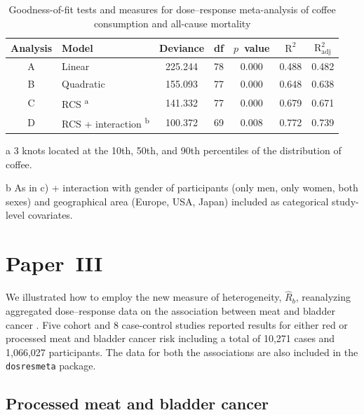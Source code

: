 \documentclass[11pt,a4paper,twoside,openany]{book}\usepackage{knitr}
\begin{document}
{{\begin{table}[!h]
\begin{threeparttable}
\caption{\label{tab:gof_tab}Goodness-of-fit tests and measures for dose--response meta-analysis of coffee consumption and all-cause mortality \citep{crippa2014coffee}}
\centering
\begin{tabular}[t]{c>{\centering\arraybackslash}p{5.8cm}ccccc}
\toprule
Analysis & Model & Deviance & df & $p$~value & \textrm{$\mathrm{R^2}$} & \textrm{$\mathrm{R_{\textrm{adj}}^2}$}\\
\midrule
A & Linear & 225.244 & 78 & 0.000 & 0.488 & 0.482\\
B & Quadratic & 155.093 & 77 & 0.000 & 0.648 & 0.638\\
C & RCS \textsuperscript{a} & 141.332 & 77 & 0.000 & 0.679 & 0.671\\
D & RCS + interaction \textsuperscript{b} & 100.372 & 69 & 0.008 & 0.772 & 0.739\\
\bottomrule
\end{tabular}
\begin{tablenotes}
\small
\item[a] 3 knots located at the 10th, 50th, and 90th percentiles of the distribution of coffee.
\item[b] As in c) + interaction with gender of participants (only men, only women, both sexes) and geographical area (Europe, USA, Japan) included as categorical study-level covariates.
\end{tablenotes}
\end{threeparttable}
\end{table}




\section{Paper~III}\label{sec:res_paperIII}



We illustrated how to employ the new measure of heterogeneity, $\hat R_b$, reanalyzing aggregated dose--response data on the association between meat and bladder cancer \citep{crippa2016red}. Five cohort and 8 case-control studies reported results for either red or processed meat and bladder cancer risk including a total of 10,271 cases and 1,066,027 participants. The data for both the associations are also included in the \texttt{dosresmeta} package.

\subsection{Processed meat and bladder cancer}

}}
\end{document}
